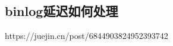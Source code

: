 \documentclass[../../../interview-questions.tex]{subfiles}
\begin{document}
\subsection{binlog延迟如何处理}

https://juejin.cn/post/6844903824952393742
\end{document}
